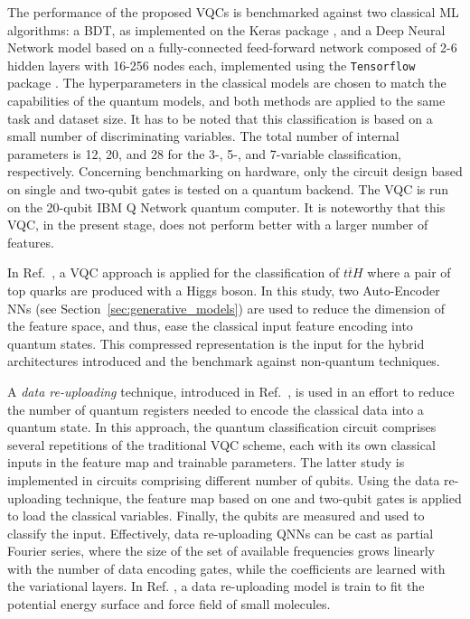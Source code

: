 The performance of the proposed VQCs is benchmarked against two classical ML algorithms: a BDT, as implemented on the Keras package \cite{chollet2015keras}, and a Deep Neural Network model based on a fully-connected feed-forward network composed of 2-6 hidden layers with 16-256 nodes each, implemented using the \texttt{Tensorflow} package \cite{tensorflow2015-whitepaper}.
The hyperparameters in the classical models are chosen to match the capabilities of the quantum models, and both methods  are applied to the same task and dataset size. It has to be noted that this classification is based on a small number of discriminating variables. The total number of internal parameters is 12, 20, and 28 for the 3-, 5-, and 7-variable classification, respectively. Concerning benchmarking on hardware, only the circuit design based on single and two-qubit gates is tested on a quantum backend. The VQC is run on the 20-qubit IBM Q Network quantum computer. It is noteworthy that this VQC, in the present stage, does not perform better with a larger number of features.

In Ref.~\cite{Belis2021}, a VQC approach is applied for the classification of $t\overline{t}H$ where a pair of top quarks are produced with a Higgs boson. 
In this study, two Auto-Encoder NNs (see Section~\ref{sec:generative_models}) are used to reduce the dimension of the feature space, and thus, ease the classical input feature encoding into quantum states.
This compressed representation is the input for the hybrid architectures introduced and the benchmark against non-quantum techniques. 

A \textit{data re-uploading} technique, introduced in Ref.~\cite{Schuld21_Fourier,perezsalinas:2020reuploading}, is used in an effort to reduce the number of quantum registers needed to encode the classical data into a quantum state.
In this approach, the quantum classification circuit comprises several repetitions of the traditional VQC scheme, each with its own classical inputs in the feature map and trainable parameters. 
The latter study is implemented in circuits comprising different number of qubits. Using the data re-uploading technique, the feature map  based on one and two-qubit gates is applied to load the classical variables.
Finally, the qubits are measured and used to classify the input.
Effectively, data re-uploading QNNs can be cast as partial Fourier series, where the size of the set of available frequencies grows linearly with the number of data encoding gates, while the coefficients are learned with the variational layers. In Ref. \cite{Kiss22_QNNFF}, a data re-uploading model is train to fit the potential energy surface and force field of small molecules. 

